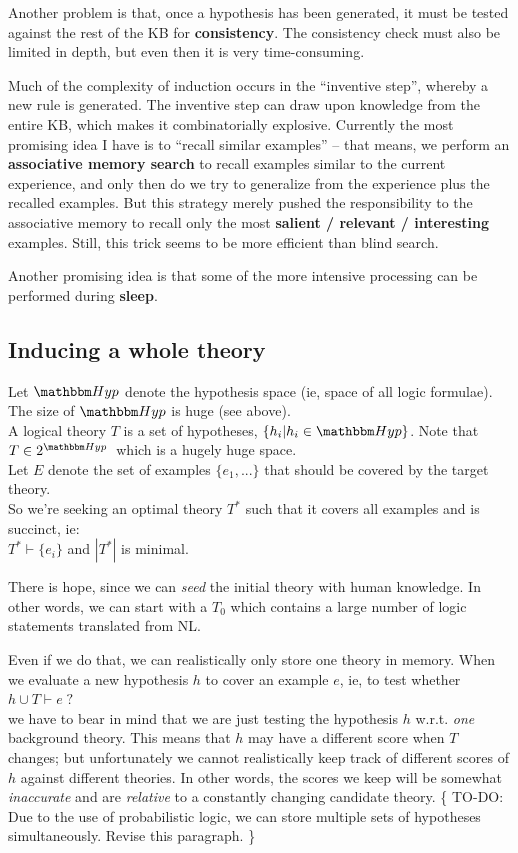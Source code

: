 Another problem is that, once a hypothesis has been generated, it must be tested against the rest of the KB for \textbf{consistency}.  The consistency check must also be limited in depth, but even then it is very time-consuming.

Much of the complexity of induction occurs in the ``inventive step'', whereby a new rule is generated.  The inventive step can draw upon knowledge from the entire KB, which makes it combinatorially explosive.  Currently the most promising idea I have is to ``recall similar examples'' -- that means, we perform an \textbf{associative memory search} to recall examples similar to the current experience, and only then do we try to generalize from the experience plus the recalled examples.  But this strategy merely pushed the responsibility to the associative memory to recall only the most \textbf{salient / relevant / interesting} examples.  Still, this trick seems to be more efficient than blind search.

Another promising idea is that some of the more intensive processing can be performed during \textbf{sleep}.

\subsection{Inducing a whole theory}
\label{sec:complexity-of-hypothesis-space}

Let $\Hyp$  denote the hypothesis space (ie, space of all logic formulae).  The size of $\Hyp$ is huge (see above).\\
A logical theory $T$ is a set of hypotheses, $ \{ h_i | h_i \in \Hyp \} $.  Note that $ T \in 2^{\Hyp} \;$ which is a hugely huge space.\\
Let $E$ denote the set of examples $\{ e_1, ... \}$ that should be covered by the target theory.\\
So we're seeking an optimal theory $T^*$ such that it covers all examples and is succinct, ie:\\
\hspace*{1cm} $ T^* \vdash \{ e_i \} $ \quad and \quad $ |T^*| $ is minimal.

There is hope, since we can \textit{seed} the initial theory with human knowledge.  In other words, we can start with a $T_0$ which contains a large number of logic statements translated from NL.

Even if we do that, we can realistically only store one theory in memory.  When we evaluate a new hypothesis $h$ to cover an example $e$, ie, to test whether\\
\hspace*{1cm} $h \cup T \vdash e \; ?$\\
we have to bear in mind that we are just testing the hypothesis $h$ w.r.t. \textit{one} background theory.  This means that $h$ may have a different score when $T$ changes;  but unfortunately we cannot realistically keep track of different scores of $h$ against different theories.  In other words, the scores we keep will be somewhat \textit{inaccurate} and are \textit{relative} to a constantly changing candidate theory.  \{ TO-DO:  Due to the use of probabilistic logic, we can store multiple sets of hypotheses simultaneously.  Revise this paragraph. \}

